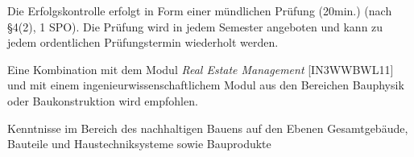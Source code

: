 \begin{course}

\setdoclanguagegerman
{}



\coursehead


\label{cour_6851.dp_997}


\begin{styleenv}
\begin{assessment}
Die Erfolgskontrolle erfolgt in Form einer mündlichen Prüfung (20min.) (nach §4(2), 1 SPO).\newline
Die Prüfung wird in jedem Semester angeboten und kann zu jedem ordentlichen Prüfungstermin wiederholt werden.


\end{assessment}

\begin{conditions}Eine Kombination mit dem Modul \emph{Real Estate Management} [IN3WWBWL11] und mit einem ingenieurwissenschaftlichem Modul aus den Bereichen Bauphysik oder Baukonstruktion wird empfohlen.

\end{conditions}


\end{styleenv}

\begin{learningoutcomes}
Kenntnisse im Bereich des nachhaltigen Bauens auf den Ebenen Gesamtgebäude, Bauteile und Haustechniksysteme sowie Bauprodukte


\end{learningoutcomes}


\end{course}
